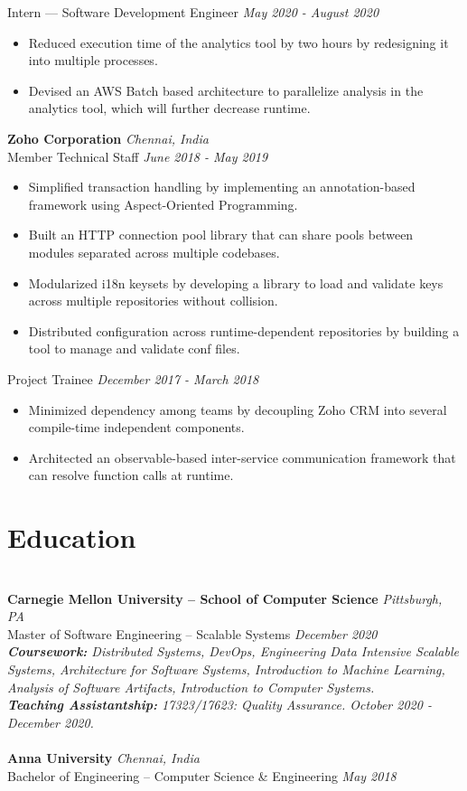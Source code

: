 \documentclass{resume}
\begin{document}
{\small Intern --- Software Development Engineer} \hfill \textit{\small May 2020 - August 2020}
\begin{itemize}
  \item Reduced execution time of the analytics tool by two hours by redesigning it into multiple processes.
  \item Devised an AWS Batch based architecture to parallelize analysis in the analytics tool, which will further decrease runtime.
\end{itemize}
\textbf{Zoho Corporation} \hfill \textit{Chennai, India} \\
{\small Member Technical Staff} \hfill \textit{\small June 2018 - May 2019}
\begin{itemize}
  \item Simplified transaction handling by implementing an annotation-based framework using Aspect-Oriented Programming.
  \item Built an HTTP connection pool library that can share pools between modules separated across multiple codebases.
  \item Modularized i18n keysets by developing a library to load and validate keys across multiple repositories without collision.
  \item Distributed configuration across runtime-dependent repositories by building a tool to manage and validate conf files.
\end{itemize}
{\small Project Trainee} \hfill \textit{\small December 2017 - March 2018}
\begin{itemize}
  \item Minimized dependency among teams by decoupling Zoho CRM into several compile-time independent components.
  \item Architected an observable-based inter-service communication framework that can resolve function calls at runtime.
\end{itemize}
	
\section*{Education}
\titlerule[0.2pt]
\noindent
\\
\textbf{Carnegie Mellon University -- School of Computer Science} \hfill \textit{Pittsburgh, PA} \\
{\small Master of Software Engineering -- Scalable Systems} \hfill \textit{\small December 2020}\\
\textit{\textbf{Coursework:} Distributed Systems, DevOps, Engineering Data Intensive Scalable Systems, Architecture for Software Systems, Introduction to Machine Learning, Analysis of Software Artifacts, Introduction to Computer Systems.}\\
\textit{\textbf{Teaching Assistantship:} 17323/17623: Quality Assurance. October 2020 - December 2020.}\\
\\
\textbf{Anna University} \hfill \textit{Chennai, India} \\
{\small Bachelor of Engineering -- Computer Science \& Engineering} \hfill \textit{\small May 2018}
\end{document}
